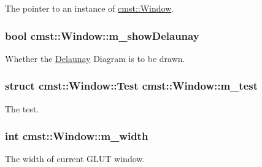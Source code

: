 The pointer to an instance of \hyperlink{classcmst_1_1_window}{cmst\+::\+Window}. 

\subsubsection[{\texorpdfstring{m\+\_\+show\+Delaunay}{m_showDelaunay}}]{\setlength{\rightskip}{0pt plus 5cm}bool cmst\+::\+Window\+::m\+\_\+show\+Delaunay\hspace{0.3cm}{\ttfamily [private]}}\hypertarget{classcmst_1_1_window_a527a10c574abe1ad1e0279465b07a7f0}{}\label{classcmst_1_1_window_a527a10c574abe1ad1e0279465b07a7f0}


Whether the \hyperlink{class_delaunay}{Delaunay} Diagram is to be drawn. 

\subsubsection[{\texorpdfstring{m\+\_\+test}{m_test}}]{\setlength{\rightskip}{0pt plus 5cm}struct {\bf cmst\+::\+Window\+::\+Test}  cmst\+::\+Window\+::m\+\_\+test\hspace{0.3cm}{\ttfamily [protected]}}\hypertarget{classcmst_1_1_window_aedae466fb2efd886cea6d775b20fabe3}{}\label{classcmst_1_1_window_aedae466fb2efd886cea6d775b20fabe3}


The test. 

\subsubsection[{\texorpdfstring{m\+\_\+width}{m_width}}]{\setlength{\rightskip}{0pt plus 5cm}int cmst\+::\+Window\+::m\+\_\+width\hspace{0.3cm}{\ttfamily [private]}}\hypertarget{classcmst_1_1_window_a2955f1032cf2ab577a5f01776e46f671}{}\label{classcmst_1_1_window_a2955f1032cf2ab577a5f01776e46f671}


The width of current G\+L\+UT window. 

